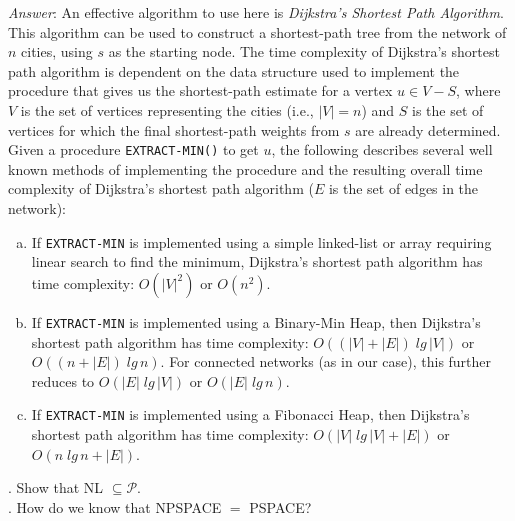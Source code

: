 \documentclass{scrartcl}
\begin{document}
    \noindent
    \textit{Answer}: An effective algorithm to use here is \emph{Dijkstra's Shortest Path
    Algorithm}. This algorithm can be used to construct a shortest-path tree from the network of $n$
    cities, using $s$ as the starting node. The time complexity of Dijkstra's shortest path
    algorithm is dependent on the data structure used to implement the procedure that gives us the
    shortest-path estimate for a vertex $u \in V - S$, where $V$ is the set of vertices representing
    the cities (i.e., $|V| = n$) and $S$ is the set of vertices for which the final shortest-path
    weights from $s$ are already determined. Given a procedure \verb|EXTRACT-MIN()| to get $u$, the
    following describes several well known methods of implementing the procedure and the resulting
    overall time complexity of Dijkstra's shortest path algorithm ($E$ is the set of edges in the
    network):
    \begin{enumerate}[(a)]
        \item If \verb|EXTRACT-MIN| is implemented using a simple linked-list or array requiring
            linear search to find the minimum, Dijkstra's shortest path algorithm has time
            complexity: $O(|V|^2)$ or $O(n^2)$.\\
        \item If \verb|EXTRACT-MIN| is implemented using a Binary-Min Heap, then Dijkstra's shortest
            path algorithm has time complexity: $O((|V| + |E|)\;lg\,|V|)$ or $O((n + |E|)\;lg\,n)$.
            For connected networks (as in our case), this further reduces to $O(|E|\;lg\,|V|)$ or
            $O(|E|\;lg\,n)$.\\
        \item If \verb|EXTRACT-MIN| is implemented using a Fibonacci Heap, then Dijkstra's shortest
            path algorithm has time complexity: $O(|V|\;lg\,|V| + |E|)$ or $O(n\;lg\,n + |E|)$.
    \end{enumerate}

    \bigskip
    . Show that \textsf{NL} $\subseteq \mathcal{P}$.\\

    \bigskip
    . How do we know that \textsf{NPSPACE $=$ PSPACE}?\\
\end{document}
